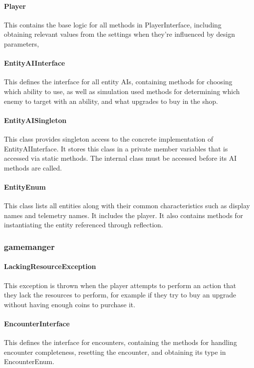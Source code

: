 \documentclass[11pt]{article}
\begin{document}
\paragraph{Player}
This contains the base logic for all methods in PlayerInterface, including obtaining relevant values from the settings when they're influenced by design parameters, 

\paragraph{EntityAIInterface}
This defines the interface for all entity AIs, containing methods for choosing which ability to use, as well as simulation used methods for determining which enemy to target with an ability, and what upgrades to buy in the shop. 

\paragraph{EntityAISingleton}
This class provides singleton access to the concrete implementation of EntityAIInterface. It stores this class in a private member variables that is accessed via static methods. The internal class must be accessed before its AI methods are called. 

\paragraph{EntityEnum}
This class lists all entities along with their common characteristics such as display names and telemetry names. It includes the player. It also contains methods for instantiating the entity referenced through reflection.

\subsubsection{gamemanger}
\paragraph{LackingResourceException}
This exception is thrown when the player attempts to perform an action that they lack the resources to perform, for example if they try to buy an upgrade without having enough coins to purchase it. 

\paragraph{EncounterInterface}
This defines the interface for encounters, containing the methods for handling encounter completeness, resetting the encounter, and obtaining its type in EncounterEnum. 
\end{document}
